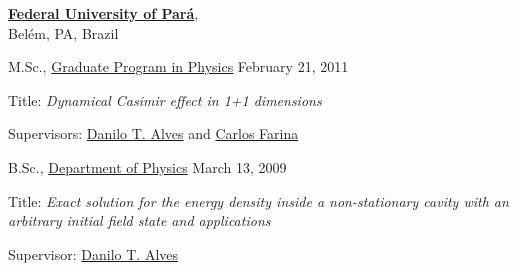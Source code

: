 \documentclass[11pt]{article}
\newcommand{\halfblankline}{\quad\vspace{-0.5\baselineskip}\pagebreak[3]}
\begin{document}
\halfblankline

\href{http://www.ufpa.br/}{\textbf{Federal University of Par\'a}}, \\
Bel\'em, PA, Brazil
\begin{outerlist}
\vspace{-.15cm}
\item[] M.Sc.,
        \href{http://www.ppgf.ufpa.br}
             {Graduate Program in Physics}
             \hfill February 21, 2011
        \begin{innerlist}
        \item Title: \emph{Dynamical Casimir effect in 1+1 dimensions}
        \item Supervisors:
        \href{http://lattes.cnpq.br/6642002445572793}{Danilo T. Alves}
        and
        \href{http://www.if.ufrj.br/docentes/carlos-farina-de-souza/}{Carlos Farina}
        \end{innerlist}
\item[] B.Sc.,
        \href{http://www.facfis.ufpa.br}
             {Department of Physics}
             \hfill March 13, 2009
        \begin{innerlist}
        \item Title: \emph{Exact solution for the energy density inside a non-stationary cavity with an arbitrary initial field state and applications}
        \item Supervisor:
        \href{http://lattes.cnpq.br/6642002445572793}{Danilo T. Alves}
        \end{innerlist}
\end{outerlist}

\end{document}

